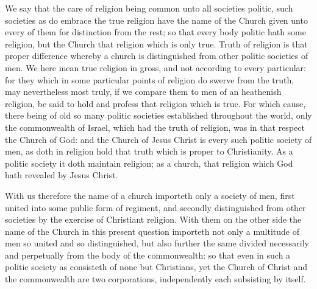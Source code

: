 We say that the care of religion being common unto all societies politic, such societies as do embrace the true religion have the name of the Church given unto every of them for distinction from the rest; so that every body politic hath some religion, but the Church that religion which is only true. Truth of religion is that proper difference whereby a church is distinguished from other politic societies of men. We here mean true religion in gross, and not according to every particular: for they which in some particular points of religion do swerve from the truth, may nevertheless most truly, if we compare them to men of an heathenish religion, be said to hold and profess that religion which is true. For which cause, there being of old so many politic societies established throughout the world, only the commonwealth of Israel, which had the truth of religion, was in that respect the Church of God: and the Church of Jesus Christ is every such politic society of men, as doth in religion hold that truth which is proper to Christianity. As a politic society it doth maintain religion; as a church, that religion which God hath revealed by Jesus Christ.

With us therefore the name of a church importeth only a society of men, first united into some public form of regiment, and secondly distinguished from other societies by the exercise of Christiant religion. With them on the other side the name of the Church in this present question importeth not only a multitude of men so united and so distinguished, but also further the same divided necessarily and perpetually from the body of the commonwealth: so that even in such a politic society as consisteth of none but Christians, yet the Church of  Christ and the commonwealth are two corporations, independently each subsisting by itself.

